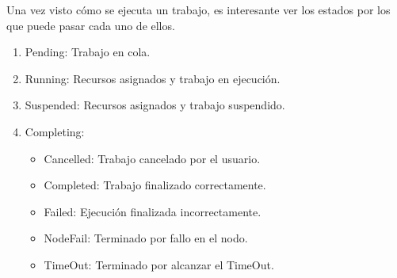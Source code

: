 Una vez visto cómo se ejecuta un trabajo, es interesante ver los estados por los que puede pasar cada uno de ellos.
\begin{enumerate}
\item Pending: Trabajo en cola.
\item Running: Recursos asignados y trabajo en ejecución.
\item Suspended: Recursos asignados y trabajo suspendido.
\item Completing:
\begin{itemize}
\item Cancelled: Trabajo cancelado por el usuario.
\item Completed: Trabajo finalizado correctamente.
\item Failed: Ejecución finalizada incorrectamente.
\item NodeFail: Terminado por fallo en el nodo.
\item TimeOut: Terminado por alcanzar el TimeOut.
\end{itemize}
\end{enumerate}


